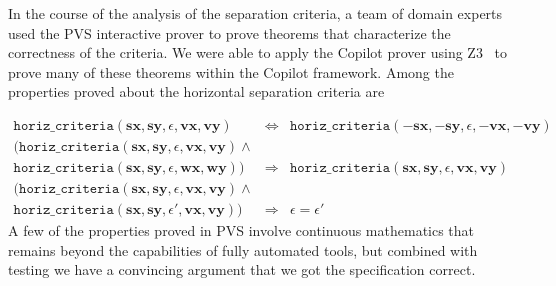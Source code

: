 In the course of the analysis of the separation criteria, a team of
domain experts used the PVS interactive prover to prove theorems that
characterize the correctness of the criteria.  We were able to apply
the Copilot prover using Z3~\cite{DeMoura2008} to prove many of these theorems
within the Copilot framework. Among the properties proved about the
horizontal separation criteria are

\begin{eqnarray*}
\texttt{horiz\_criteria}(\bm{sx},  \bm{sy},
\epsilon,  \bm{vx},  \bm{vy}) & \Longleftrightarrow &
\texttt{horiz\_criteria}(\bm{-sx},  \bm{-sy},
\epsilon, \bm{-vx},  \bm{-vy})   \\
( \texttt{horiz\_criteria}(\bm{sx},\bm{sy},
\epsilon, \bm{vx},\bm{vy})  \wedge &&  \\ 
\texttt{horiz\_criteria} (\bm{sx},  \bm{sy},
\epsilon,  \bm{wx}, \bm{wy}) )& \Longrightarrow&
\texttt{horiz\_criteria} (\bm{sx}, \bm{sy},
\epsilon,\bm{vx},\bm{vy})\\
( \texttt{horiz\_criteria}(\bm{sx},  \bm{sy},
\epsilon,  \bm{vx},  \bm{vy})  \wedge  &&\\
\texttt{horiz\_criteria}(\bm{sx},  \bm{sy}, \epsilon',  \bm{vx},  \bm{vy}) )  &\Longrightarrow & \epsilon = \epsilon'
\end{eqnarray*}
A few of the properties proved in PVS involve continuous mathematics
that remains beyond the capabilities of fully automated tools,
but combined with testing we have a convincing argument that we got the
specification correct. 


%
%




